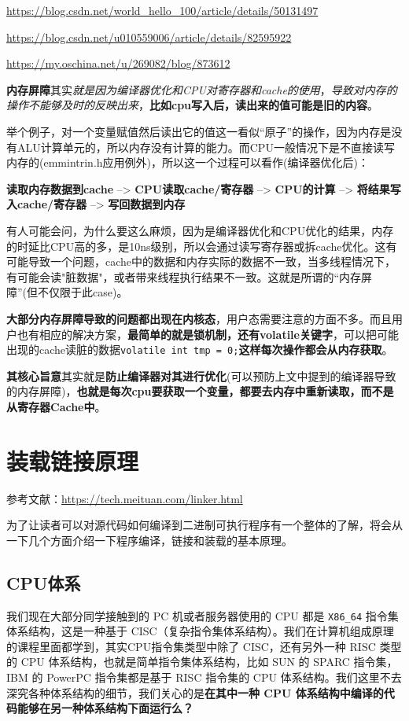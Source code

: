 \documentclass[UTF8,a4paper,12pt]{ctexbook}
\begin{document}
		\url{https://blog.csdn.net/world_hello_100/article/details/50131497}
		
		\url{https://blog.csdn.net/u010559006/article/details/82595922}
		
		\url{https://my.oschina.net/u/269082/blog/873612}
		
		\textbf{内存屏障}其实\textit{就是因为编译器优化和CPU对寄存器和cache的使用}，\textit{导致对内存的操作不能够及时的反映出来}，\textbf{比如cpu写入后，读出来的值可能是旧的内容}。
		
		举个例子，对一个变量赋值然后读出它的值这一看似“原子”的操作，因为内存是没有ALU计算单元的，所以内存没有计算的能力。而CPU一般情况下是不直接读写内存的(emmintrin.h应用例外)，所以这一个过程可以看作(编译器优化后)：
		
		\textbf{读取内存数据到cache} -->  \textbf{CPU读取cache/寄存器}  -->  \textbf{CPU的计算}  -->  \textbf{将结果写入cache/寄存器}  -->  \textbf{写回数据到内存}
		
		有人可能会问，为什么要这么麻烦，因为是编译器优化和CPU优化的结果，内存的时延比CPU高的多，是10ns级别，所以会通过读写寄存器或拆cache优化。这有可能导致一个问题，cache中的数据和内存实际的数据不一致，当多线程情况下，有可能会读"脏数据"，或者带来线程执行结果不一致。这就是所谓的“内存屏障”(但不仅限于此case)。
		
		\textbf{大部分内存屏障导致的问题都出现在内核态}，用户态需要注意的方面不多。而且用户也有相应的解决方案，\textbf{最简单的就是锁机制，还有volatile关键字}，可以把可能出现的cache读脏的数据\verb|volatile int tmp = 0;|\textbf{这样每次操作都会从内存获取}。
		
		\textbf{其核心旨意}其实就是\textbf{防止编译器对其进行优化}(可以预防上文中提到的编译器导致的内存屏障)，\textbf{也就是每次cpu要获取一个变量，都要去内存中重新读取，而不是从寄存器Cache中}。
		
\chapter{装载链接原理}
	参考文献：\url{https://tech.meituan.com/linker.html}
	
	为了让读者可以对源代码如何编译到二进制可执行程序有一个整体的了解，将会从一下几个方面介绍一下程序编译，链接和装载的基本原理。
	
	\section{CPU体系}
		我们现在大部分同学接触到的 PC 机或者服务器使用的 CPU 都是 \verb|X86_64| 指令集体系结构，这是一种基于 CISC（复杂指令集体系结构）。我们在计算机组成原理的课程里面都学到，其实CPU指令集类型中除了 CISC，还有另外一种 RISC 类型的 CPU 体系结构，也就是简单指令集体系结构，比如 SUN 的 SPARC 指令集，IBM 的 PowerPC 指令集都是基于 RISC 指令集的 CPU 体系结构。我们这里不去深究各种体系结构的细节，我们关心的是\textbf{在其中一种 CPU 体系结构中编译的代码能够在另一种体系结构下面运行么？}
		
\end{document}

